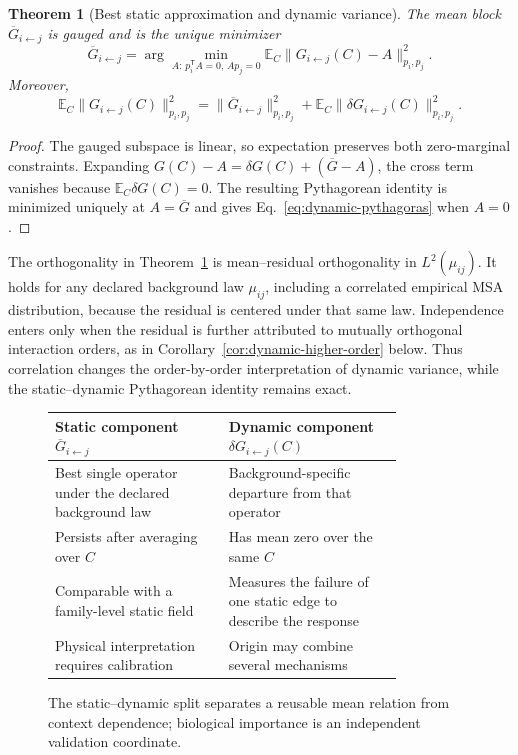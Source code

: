 \documentclass[10pt]{article}
\newcommand{\E}{\mathbb E}
\newtheorem{theorem}{Theorem}[section]
\theoremstyle{definition}
\theoremstyle{remark}
\begin{document}
\begin{theorem}[Best static approximation and dynamic variance]
\label{thm:static-dynamic}
The mean block $\overline G_{i\leftarrow j}$ is gauged and is the unique minimizer
\begin{equation}
\overline G_{i\leftarrow j}
=\arg\min_{A:\,p_i^{\mathsf T}A=0,\,Ap_j=0}
\E_C\|G_{i\leftarrow j}(C)-A\|_{p_i,p_j}^2.
\label{eq:best-static}
\end{equation}
Moreover,
\begin{equation}
\E_C\|G_{i\leftarrow j}(C)\|_{p_i,p_j}^2
=\|\overline G_{i\leftarrow j}\|_{p_i,p_j}^2
+\E_C\|\delta G_{i\leftarrow j}(C)\|_{p_i,p_j}^2.
\label{eq:dynamic-pythagoras}
\end{equation}
\end{theorem}

\begin{proof}
The gauged subspace is linear, so expectation preserves both zero-marginal constraints.  Expanding
$G(C)-A=\delta G(C)+(\overline G-A)$, the cross term vanishes because
$\E_C\delta G(C)=0$.  The resulting Pythagorean identity is minimized uniquely at
$A=\overline G$ and gives Eq.~\ref{eq:dynamic-pythagoras} when $A=0$.
\end{proof}

The orthogonality in Theorem~\ref{thm:static-dynamic} is mean--residual orthogonality in
$L^2(\mu_{ij})$.  It holds for any declared background law $\mu_{ij}$, including a correlated
empirical MSA distribution, because the residual is centered under that same law.  Independence
enters only when the residual is further attributed to mutually orthogonal interaction orders, as
in Corollary~\ref{cor:dynamic-higher-order} below.  Thus correlation changes the order-by-order
interpretation of dynamic variance, while the static--dynamic Pythagorean identity remains exact.

\ifdefined\BOOKMODE
\begin{figure}[htbp]
\centering
\small
\begin{tabular}{@{}>{\raggedright\arraybackslash}p{0.41\linewidth}
                >{\raggedright\arraybackslash}p{0.41\linewidth}@{}}
\toprule
Static component $\overline G_{i\leftarrow j}$ & Dynamic component $\delta G_{i\leftarrow j}(C)$ \\
\midrule
Best single operator under the declared background law & Background-specific departure from that operator \\
Persists after averaging over $C$ & Has mean zero over the same $C$ \\
Comparable with a family-level static field & Measures the failure of one static edge to describe the response \\
Physical interpretation requires calibration & Origin may combine several mechanisms \\
\bottomrule
\end{tabular}
\caption{The static--dynamic split separates a reusable mean relation from context dependence;
biological importance is an independent validation coordinate.}
\label{fig:static-dynamic-map}
\end{figure}
\fi
\end{document}
